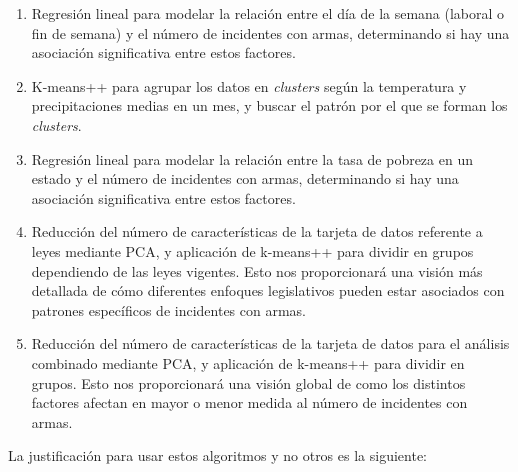\documentclass[11pt,a4paper]{article}
\begin{document}
\begin{enumerate}
    \item Regresión lineal para modelar la relación entre el día de la semana (laboral o fin de semana) y el número de incidentes con armas, determinando si hay una asociación significativa entre estos factores.
    \item K-means++ para agrupar los datos en \textit{clusters} según la temperatura y precipitaciones medias en un mes, y buscar el patrón por el que se forman los \textit{clusters}.
    \item Regresión lineal para modelar la relación entre la tasa de pobreza en un estado y el número de incidentes con armas, determinando si hay una asociación significativa entre estos factores.
    \item Reducción del número de características de la tarjeta de datos referente a leyes mediante PCA, y aplicación de k-means++ para dividir en grupos dependiendo de las leyes vigentes. Esto nos proporcionará una visión más detallada de cómo diferentes enfoques legislativos pueden estar asociados con patrones específicos de incidentes con armas.
    \item Reducción del número de características de la tarjeta de datos para el análisis combinado mediante PCA, y aplicación de k-means++ para dividir en grupos. Esto nos proporcionará una visión global de como los distintos factores afectan en mayor o menor medida al número de incidentes con armas.
\end{enumerate}

La justificación para usar estos algoritmos y no otros es la siguiente:
\end{document}
